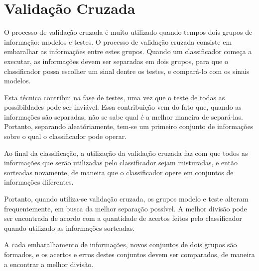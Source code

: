 \documentclass[a4paper,12pt,oneside]{report}
\begin{document}
\section{Valida\c{c}\~{a}o Cruzada}
\label{sec:validacao_cruzada}
\hspace*{+15pt} O processo de valida\c{c}\~{a}o cruzada \'{e} muito utilizado quando tempos dois grupos de informa\c{c}\~{a}o: modelos e testes. O processo de valida\c{c}\~{a}o cruzada consiste em embaralhar as informa\c{c}\~{o}es entre estes grupos. Quando um classificador come\c{c}a a executar, as informa\c{c}\~{o}es devem ser separadas em dois grupos, para que o classificador possa escolher um sinal dentre os testes, e compar\'{a}-lo com os sinais modelos. 
\\
\par Esta t\'{e}cnica contribui na fase de testes, uma vez que o teste de todas as possibildades pode ser invi\'{a}vel. Essa contribui\c{c}\~{a}o vem do fato que, quando as informa\c{c}\~{o}es s\~{a}o separadas, n\~{a}o se sabe qual \'{e} a melhor maneira de separ\'{a}-las. Portanto, separando aleat\'{o}riamente, tem-se um primeiro conjunto de informa\c{c}\~{o}es sobre o qual o classificador pode operar. 
\\
\par Ao final da classifica\c{c}\~{a}o, a utiliza\c{c}\~{a}o da valida\c{c}\~{a}o cruzada faz com que todos as informa\c{c}\~{o}es que ser\~{a}o utilizadas pelo classificador sejam misturadas, e ent\~{a}o sorteadas novamente, de maneira que o classificador opere em conjuntos de informa\c{c}\~{o}es diferentes. 
\\
\par Portanto, quando utiliza-se valida\c{c}\~{a}o cruzada, os grupos modelo e teste alteram frequentemente, em busca da melhor separa\c{c}\~{a}o poss\'{i}vel. A melhor divis\~{a}o pode ser encontrada de acordo com a quantidade de acertos feitos pelo classificador quando utilizado as informa\c{c}\~{o}es sorteadas. 
\\
\par A cada embaralhamento de informa\c{c}\~{o}es, novos conjuntos de dois grupos s\~{a}o formados, e os acertos e erros destes conjuntos devem ser comparados, de maneira a encontrar a melhor divis\~{a}o. 
\end{document}
